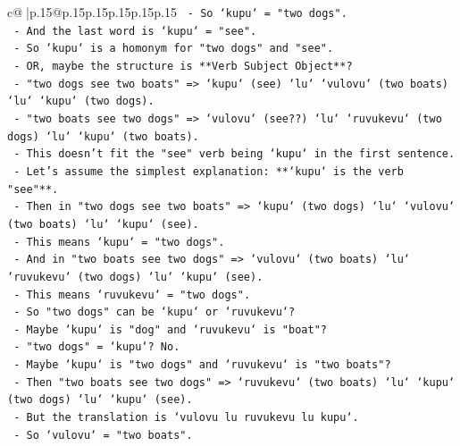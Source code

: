 \documentclass{article}
\begin{document}
{\begin{supertabular}{c@{$\;$}|p{.15\linewidth}@{}p{.15\linewidth}p{.15\linewidth}p{.15\linewidth}p{.15\linewidth}p{.15\linewidth}}
{{{\texttt{                       {-} So `kupu` = "two dogs".} \\
\texttt{                       {-} And the last word is `kupu` = "see".} \\
\texttt{                       {-} So `kupu` is a homonym for "two dogs" and "see".} \\
\texttt{                       {-} OR, maybe the structure is **Verb Subject Object**?} \\
\texttt{                         {-} "two dogs see two boats" => `kupu` (see) `lu` `vulovu` (two boats) `lu` `kupu` (two dogs).} \\
\texttt{                         {-} "two boats see two dogs" => `vulovu` (see??) `lu` `ruvukevu` (two dogs) `lu` `kupu` (two boats).} \\
\texttt{                         {-} This doesn't fit the "see" verb being `kupu` in the first sentence.} \\
\texttt{                       {-} Let's assume the simplest explanation: **`kupu` is the verb "see"**.} \\
\texttt{                       {-} Then in "two dogs see two boats" => `kupu` (two dogs) `lu` `vulovu` (two boats) `lu` `kupu` (see).} \\
\texttt{                       {-} This means `kupu` = "two dogs".} \\
\texttt{                       {-} And in "two boats see two dogs" => `vulovu` (two boats) `lu` `ruvukevu` (two dogs) `lu` `kupu` (see).} \\
\texttt{                       {-} This means `ruvukevu` = "two dogs".} \\
\texttt{                       {-} So "two dogs" can be `kupu` or `ruvukevu`?} \\
\texttt{                       {-} Maybe `kupu` is "dog" and `ruvukevu` is "boat"?} \\
\texttt{                       {-} "two dogs" = `kupu`? No.} \\
\texttt{                       {-} Maybe `kupu` is "two dogs" and `ruvukevu` is "two boats"?} \\
\texttt{                       {-} Then "two boats see two dogs" => `ruvukevu` (two boats) `lu` `kupu` (two dogs) `lu` `kupu` (see).} \\
\texttt{                       {-} But the translation is `vulovu lu ruvukevu lu kupu`.} \\
\texttt{                       {-} So `vulovu` = "two boats".} \\
}}}
\end{supertabular}}
\end{document}

